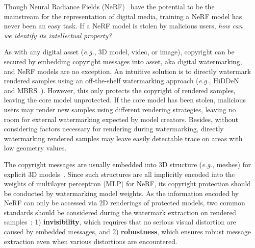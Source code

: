 \documentclass[10pt,twocolumn,letterpaper]{article}
\def\eg{{\emph{e.g.}}}
\def\eg{\emph{e.g.}}
\def\eg{{\emph{e.g.}}}
\begin{document}

Though Neural Radiance Fields (NeRF)~\cite{nerf2020} have the potential to be the mainstream for the representation of digital media, training a NeRF model has never been an easy task. If a NeRF model is stolen by malicious users, \textit{how can we identify its intellectual property?}

As with any digital asset (\eg, 3D model, video, or image), copyright can be secured by embedding copyright messages into asset, aka digital watermarking, and NeRF models are no exception. 
An intuitive solution is to directly watermark rendered samples using an off-the-shelf watermarking approach (\eg, HiDDeN~\cite{zhu2018hidden} and MBRS~\cite{jia2021mbrs}). However, this only protects the copyright of rendered samples, leaving the core model unprotected. If the core model has been stolen, malicious users may render new samples using different rendering strategies, leaving no room for external watermarking expected by model creators. Besides, without considering factors necessary for rendering during watermarking, directly watermarking rendered samples may leave easily detectable trace on areas with low geometry values.

The copyright messages are usually embedded into 3D structure (\eg, meshes) for explicit 3D models~\cite{Yoo_2022_CVPR}. Since such structures are all implicitly encoded into the weights of multilayer perceptron (MLP) for NeRF, its copyright protection should be conducted by watermarking model weights. As the information encoded by NeRF can only be accessed via 2D renderings of protected models, two common standards should be considered during the watermark extraction on rendered samples~\cite{ahmadi2020redmark, jing2021hinet, Yang_2021_ICCV, zhang2020udh}: 1) \textbf{invisibility}, which requires that no serious visual distortion are caused by embedded messages, and 2) \textbf{robustness}, which ensures robust message extraction even when various distortions are encountered. 



\end{document}
